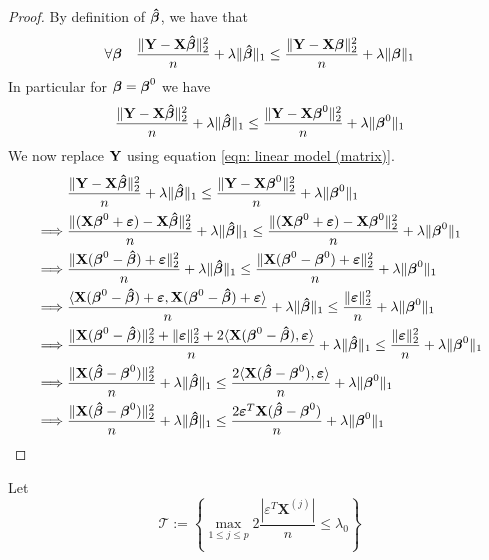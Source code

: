 \begin{proof}
    By definition of $\btahat$, we have that
    $$
        \forall \bta \quad \frac{\| \Y-\X \btahat \|_{2}^{2}}{n} + \lambda \| \btahat \|_{1} \leq \frac{\|\Y-\X \bta \|_{2}^{2}}{n}+\lambda \| \bta \|_{1}
    $$
    In particular for $\bta = \bta^0$ we have
    $$
        \frac{\| \Y-\X \btahat \|_{2}^{2}}{n}+\lambda\| \btahat \|_{1} \leq \frac{ \| \Y-\X \bta^0\|_{2}^{2}}{n}+\lambda \| \bta^0\|_{1}
    $$
    We now replace $\Y$ using equation \eqref{eqn: linear model (matrix)}.
    \begin{align*}
                 & \frac{\|\Y  - \X \btahat \|_{2}^{2}}{n} + \lambda \| \btahat\|_{1} \leq \frac{\| \Y  - \X \bta^0 \|_2^2}{n}+\lambda\|\bta^{0}\|_{1}                                                     \\
        \implies &
        \frac{\| (\X \bta^0 + \eps) - \X \btahat \|_{2}^{2}}{n}+\lambda\| \btahat \|_{1} \leq \frac{ \| (\X \bta^0 + \eps)-\X \bta^0\|_{2}^{2}}{n}+\lambda \| \bta^0\|_{1}                                 \\
        \implies &
        \frac{\| \X ( \bta^0 - \btahat) + \eps \|_{2}^{2}}{n} + \lambda\| \btahat \|_{1} \leq \frac{ \| \X ( \bta^0 - \bta^0) + \eps \|_{2}^{2}}{n}+\lambda \| \bta^0\|_{1}                                \\
        \implies &
        \frac{\langle \X ( \bta^0 - \btahat) + \eps, \X ( \bta^0 - \btahat) + \eps \rangle}{n}+\lambda \| \btahat \|_{1} \leq \frac{ \| \eps \|_{2}^{2}}{n}+\lambda \| \bta^0\|_{1}                        \\
        \implies &
        \frac{\| \X (\bta^0 - \btahat) \| _2^2 + \| \eps \|_2^2 + 2 \langle \X ( \bta^0 - \btahat),  \eps \rangle}{n}+\lambda \| \btahat \|_{1} \leq \frac{ \| \eps \|_{2}^{2}}{n}+\lambda \| \bta^0\|_{1} \\
        \implies &
        \frac{\| \X (\btahat - \bta^0) \| _2^2}{n} + \lambda \| \btahat \|_{1} \leq \frac{2 \langle \X ( \btahat - \bta^0),  \eps \rangle}{n} + \lambda \| \bta^0\|_{1}                                    \\
        \implies &
        \frac{\| \X (\btahat - \bta^0) \| _2^2}{n} + \lambda \| \btahat \|_{1} \leq \frac{2 \eps^T \X ( \btahat - \bta^0)}{n} + \lambda \| \bta^0\|_{1}                                                    \\
    \end{align*}
\end{proof}


Let
$$\mathscr{T} := \left\{\max _{1 \leq j \leq p} 2 \frac{\left| \varepsilon^{T} \mathbf{X}^{(j)}\right|}{n} \leq \lambda_{0}\right\}$$

